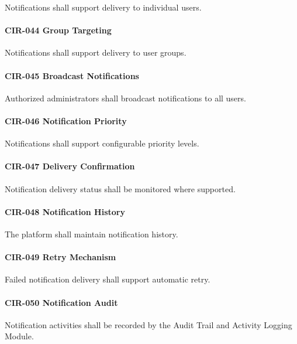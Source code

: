 Notifications shall support delivery to individual users.

\paragraph{CIR-044 Group Targeting}

Notifications shall support delivery to user groups.

\paragraph{CIR-045 Broadcast Notifications}

Authorized administrators shall broadcast notifications to all users.

\paragraph{CIR-046 Notification Priority}

Notifications shall support configurable priority levels.

\paragraph{CIR-047 Delivery Confirmation}

Notification delivery status shall be monitored where supported.

\paragraph{CIR-048 Notification History}

The platform shall maintain notification history.

\paragraph{CIR-049 Retry Mechanism}

Failed notification delivery shall support automatic retry.

\paragraph{CIR-050 Notification Audit}

Notification activities shall be recorded by the Audit Trail and
Activity Logging Module.


